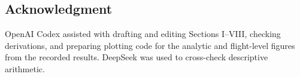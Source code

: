 \documentclass{IEEEtaes}
\begin{document}
\begin{samepage}
\section*{Acknowledgment}
OpenAI Codex assisted with drafting and editing Sections I--VIII, checking derivations, and preparing plotting code for the analytic and flight-level figures from the recorded results. DeepSeek was used to cross-check descriptive arithmetic.
\par\end{samepage}

\begingroup
\let\taesbibliography\thebibliography
\renewcommand{\thebibliography}[1]{%
  \taesbibliography{#1}\rightskip=0pt plus 2em\relax
  \interlinepenalty=10000\relax
  \let\taesbibitem\bibitem
  \def\bibitem{\def\newblock{\par\nobreak}\taesbibitem}}


\endgroup
\end{document}
